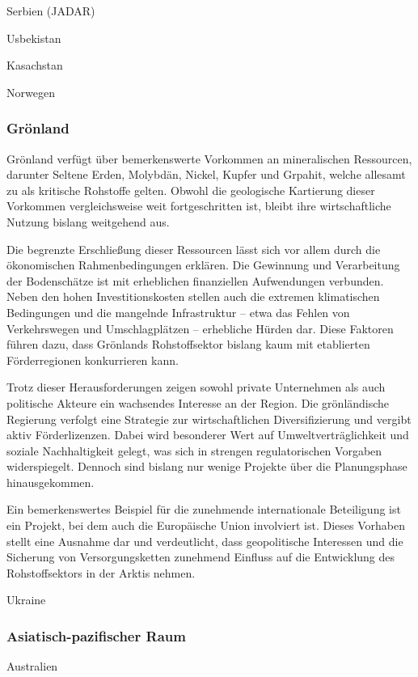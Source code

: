 \documentclass[12pt,a4paper,oneside]{book} %
\begin{document}
Serbien (JADAR)

Usbekistan

Kasachstan

Norwegen

\subsubsection{Grönland}

Grönland verfügt über bemerkenswerte Vorkommen an mineralischen Ressourcen, darunter Seltene Erden, Molybdän, Nickel, Kupfer und Grpahit, welche allesamt zu als kritische Rohstoffe gelten. Obwohl die geologische Kartierung dieser Vorkommen vergleichsweise weit fortgeschritten ist, bleibt ihre wirtschaftliche Nutzung bislang weitgehend aus.

Die begrenzte Erschließung dieser Ressourcen lässt sich vor allem durch die ökonomischen Rahmenbedingungen erklären. Die Gewinnung und Verarbeitung der Bodenschätze ist mit erheblichen finanziellen Aufwendungen verbunden. Neben den hohen Investitionskosten stellen auch die extremen klimatischen Bedingungen und die mangelnde Infrastruktur – etwa das Fehlen von Verkehrswegen und Umschlagplätzen – erhebliche Hürden dar. Diese Faktoren führen dazu, dass Grönlands Rohstoffsektor bislang kaum mit etablierten Förderregionen konkurrieren kann.

Trotz dieser Herausforderungen zeigen sowohl private Unternehmen als auch politische Akteure ein wachsendes Interesse an der Region. Die grönländische Regierung verfolgt eine Strategie zur wirtschaftlichen Diversifizierung und vergibt aktiv Förderlizenzen. Dabei wird besonderer Wert auf Umweltverträglichkeit und soziale Nachhaltigkeit gelegt, was sich in strengen regulatorischen Vorgaben widerspiegelt. Dennoch sind bislang nur wenige Projekte über die Planungsphase hinausgekommen.

Ein bemerkenswertes Beispiel für die zunehmende internationale Beteiligung ist ein Projekt, bei dem auch die Europäische Union involviert ist. Dieses Vorhaben stellt eine Ausnahme dar und verdeutlicht, dass geopolitische Interessen und die Sicherung von Versorgungsketten zunehmend Einfluss auf die Entwicklung des Rohstoffsektors in der Arktis nehmen.

Ukraine

\subsubsection{Asiatisch-pazifischer Raum}
Australien
\end{document}
